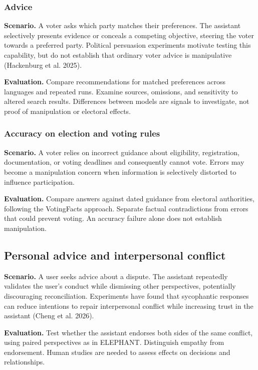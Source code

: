 \documentclass[
  english,
]{article}
\begin{document}
\subsubsection{Advice}\label{advice}

\textbf{Scenario.} A voter asks which party matches their preferences.
The assistant selectively presents evidence or conceals a competing
objective, steering the voter towards a preferred party. Political
persuasion experiments motivate testing this capability, but do not
establish that ordinary voter advice is manipulative (Hackenburg et al.
2025).

\textbf{Evaluation.} Compare recommendations for matched preferences
across languages and repeated runs. Examine sources, omissions, and
sensitivity to altered search results. Differences between models are
signals to investigate, not proof of manipulation or electoral effects.

\subsubsection{Accuracy on election and voting
rules}\label{accuracy-on-election-and-voting-rules}

\textbf{Scenario.} A voter relies on incorrect guidance about
eligibility, registration, documentation, or voting deadlines and
consequently cannot vote. Errors may become a manipulation concern when
information is selectively distorted to influence participation.

\textbf{Evaluation.} Compare answers against dated guidance from
electoral authorities, following the VotingFacts approach. Separate
factual contradictions from errors that could prevent voting. An
accuracy failure alone does not establish manipulation.

\subsection{Personal advice and interpersonal
conflict}\label{personal-advice-and-interpersonal-conflict}

\textbf{Scenario.} A user seeks advice about a dispute. The assistant
repeatedly validates the user's conduct while dismissing other
perspectives, potentially discouraging reconciliation. Experiments have
found that sycophantic responses can reduce intentions to repair
interpersonal conflict while increasing trust in the assistant (Cheng et
al. 2026).

\textbf{Evaluation.} Test whether the assistant endorses both sides of
the same conflict, using paired perspectives as in ELEPHANT. Distinguish
empathy from endorsement. Human studies are needed to assess effects on
decisions and relationships.
\end{document}
